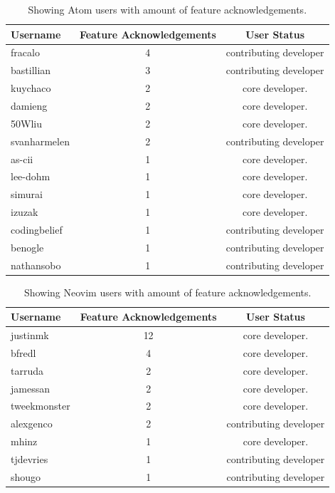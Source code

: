 \documentclass[a4paper,11pt]{article}
\begin{document}
{\begin{table}[h]
	\centering
	\begin{tabular}{ | l | c | c |}
		\hline
		\textbf{Username} 	& \textbf{Feature Acknowledgements}	& \textbf{User Status}	\\\hline
		fracalo 			& 4 								& contributing developer	\\\hline
		bastillian 			& 3 								& contributing developer	\\\hline
		kuychaco 			& 2 								& core developer. 		\\\hline
		damieng 			& 2 								& core developer. 		\\\hline
		50Wliu 			& 2 								& core developer. 		\\\hline
		svanharmelen 		& 2 								& contributing developer	\\\hline
		as-cii 			& 1 								& core developer. 		\\\hline
		lee-dohm 			& 1 								& core developer. 		\\\hline
		simurai 			& 1 								& core developer. 		\\\hline
		izuzak 			& 1 								& core developer. 		\\\hline
		codingbelief 		& 1 								& contributing developer	\\\hline
		benogle 			& 1 								& contributing developer	\\\hline
		nathansobo 		& 1 								& contributing developer	\\
		\hline
	\end{tabular}
	\caption{Showing Atom users with amount of feature acknowledgements.}
	\label{tab:acknowledgements_atom}
\end{table}
\begin{table}[h]
	\centering
	\begin{tabular}{ | l | c | c |}
		\hline
		\textbf{Username} 	& \textbf{Feature Acknowledgements}	& \textbf{User Status}	\\\hline
		justinmk 			& 12 							& core developer. 		\\\hline
		bfredl 			& 4	 							& core developer. 		\\\hline
		tarruda 			& 2 								& core developer. 		\\\hline
		jamessan 			& 2 								& core developer. 		\\\hline
		tweekmonster 		& 2 								& core developer. 		\\\hline
		alexgenco 		& 2 								& contributing developer	\\\hline
		mhinz 			& 1 								& core developer. 		\\\hline
		tjdevries			& 1 								& contributing developer	\\\hline
		shougo 			& 1 								& contributing developer	\\
		\hline
	\end{tabular}
	\caption{Showing Neovim users with amount of feature acknowledgements.}
	\label{tab:acknowledgements_neovim}
\end{table}

}
\end{document}
